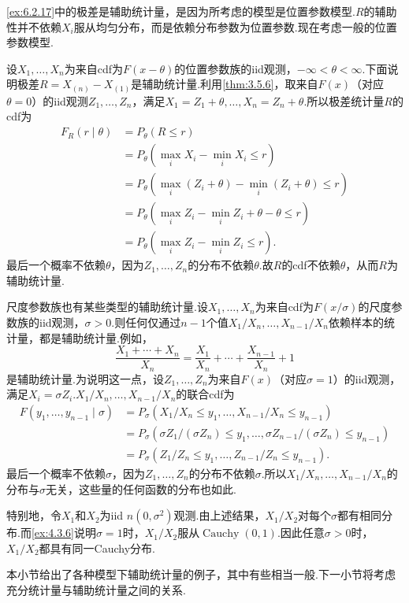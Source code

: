 \autoref{ex:6.2.17}中的极差是辅助统计量，是因为所考虑的模型是位置参数模型.$R$的辅助性并不依赖$X_i$服从均匀分布，而是依赖分布参数为位置参数.现在考虑一般的位置参数模型.
\begin{example}[位置族的辅助统计量]\label{ex:6.2.18}
设$X_1,\ldots,X_n$为来自cdf为$F(x-\theta)$的位置参数族的iid观测，$-\infty<\theta<\infty$.下面说明极差$R=X_{(n)}-X_{(1)}$是辅助统计量.利用\autoref{thm:3.5.6}，取来自$F(x)$（对应$\theta=0$）的iid观测$Z_1,\ldots,Z_n$，满足$X_1=Z_1+\theta,\ldots,X_n=Z_n+\theta$.所以极差统计量$R$的cdf为
\begin{align*}
F_R(r\mid\theta)&=P_\theta(R\le r)\\
&=P_\theta(\max_iX_i-\min_iX_i\le r)\\
&=P_\theta(\max_i(Z_i+\theta)-\min_i(Z_i+\theta)\le r)\\
&=P_\theta(\max_iZ_i-\min_iZ_i+\theta-\theta\le r)\\
&=P_\theta(\max_iZ_i-\min_iZ_i\le r).
\end{align*}
最后一个概率不依赖$\theta$，因为$Z_1,\ldots,Z_n$的分布不依赖$\theta$.故$R$的cdf不依赖$\theta$，从而$R$为辅助统计量.
\end{example}
\begin{example}[尺度族的辅助统计量]\label{ex:6.2.19}
尺度参数族也有某些类型的辅助统计量.设$X_1,\ldots,X_n$为来自cdf为$F(x/\sigma)$的尺度参数族的iid观测，$\sigma>0$.则任何仅通过$n-1$个值$X_1/X_n,\ldots,X_{n-1}/X_n$依赖样本的统计量，都是辅助统计量.例如，
$$\frac{X_1+\cdots+X_n}{X_n}=\frac{X_1}{X_n}+\cdots+\frac{X_{n-1}}{X_n}+1$$
是辅助统计量.为说明这一点，设$Z_1,\ldots,Z_n$为来自$F(x)$（对应$\sigma=1$）的iid观测，满足$X_i=\sigma Z_i$.$X_1/X_n,\ldots,X_{n-1}/X_n$的联合cdf为
\begin{align*}
F(y_1,\ldots,y_{n-1}\mid\sigma)&=P_\sigma(X_1/X_n\le y_1,\ldots,X_{n-1}/X_n\le y_{n-1})\\
&=P_\sigma(\sigma Z_1/(\sigma Z_n)\le y_1,\ldots,\sigma Z_{n-1}/(\sigma Z_n)\le y_{n-1})\\
&=P_\sigma(Z_1/Z_n\le y_1,\ldots,Z_{n-1}/Z_n\le y_{n-1}).
\end{align*}
最后一个概率不依赖$\sigma$，因为$Z_1,\ldots,Z_n$的分布不依赖$\sigma$.所以$X_1/X_n,\ldots,X_{n-1}/X_n$的分布与$\sigma$无关，这些量的任何函数的分布也如此.

特别地，令$X_1$和$X_2$为iid $n(0,\sigma^2)$观测.由上述结果，$X_1/X_2$对每个$\sigma$都有相同分布.而\autoref{ex:4.3.6}说明$\sigma=1$时，$X_1/X_2$服从$\operatorname{Cauchy}(0,1)$.因此任意$\sigma>0$时，$X_1/X_2$都具有同一Cauchy分布.
\end{example}
本小节给出了各种模型下辅助统计量的例子，其中有些相当一般.下一小节将考虑充分统计量与辅助统计量之间的关系.
